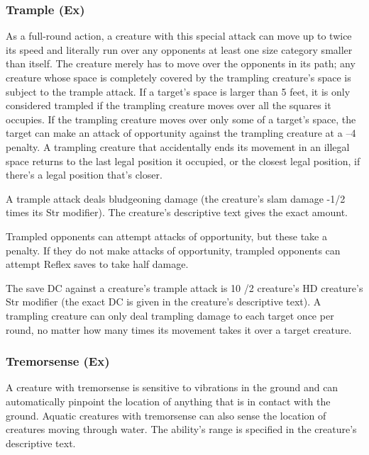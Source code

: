 {\subsubsection{Trample (Ex)} As a full-round action, a creature with this special attack can move up to twice its speed and literally run over any opponents at least one size category smaller than itself. The creature merely has to move over the opponents in its path; any creature whose space is completely covered by the trampling creature's space is subject to the trample attack. If a target's space is larger than 5 feet, it is only considered trampled if the trampling creature moves over all the squares it occupies. If the trampling creature moves over only some of a target's space, the target can make an attack of opportunity against the trampling creature at a –4 penalty. A trampling creature that accidentally ends its movement in an illegal space returns to the last legal position it occupied, or the closest legal position, if there's a legal position that's closer.

A trample attack deals bludgeoning damage (the creature's slam damage -1/2 times its Str modifier). The creature's descriptive text gives the exact amount.

Trampled opponents can attempt attacks of opportunity, but these take a  penalty. If they do not make attacks of opportunity, trampled opponents can attempt Reflex saves to take half damage.

The save DC against a creature's trample attack is 10 /2 creature's HD \add creature's Str modifier (the exact DC is given in the creature's descriptive text). A trampling creature can only deal trampling damage to each target once per round, no matter how many times its movement takes it over a target creature.

\subsubsection{Tremorsense (Ex)} A creature with tremorsense is sensitive to vibrations in the ground and can automatically pinpoint the location of anything that is in contact with the ground. Aquatic creatures with tremorsense can also sense the location of creatures moving through water. The ability's range is specified in the creature's descriptive text.

}
